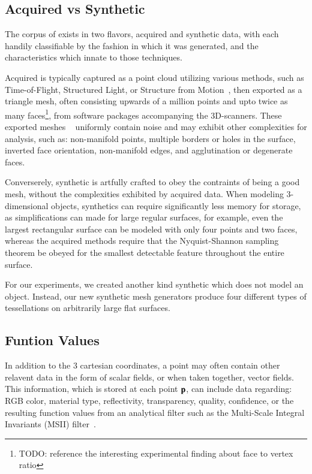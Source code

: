 \subsection{Acquired vs Synthetic \tdd{}}
\label{chBsSvA}
The corpus of \tdd{} exists in two flavors, acquired and synthetic data, with each handily classifiable by the fashion in which it was generated, and the characteristics which innate to those techniques.

Acquired \tdd{} is typically captured as a point cloud utilizing various methods, such as Time-of-Flight, Structured Light, or Structure from Motion~\cite[p.~19]{Mara12}, then exported as a triangle mesh, often consisting upwards of a million points and upto twice as many faces\footnote{TODO: reference the interesting experimental finding about face to vertex ratio}, from software packages accompanying the 3D-scanners. These exported meshes ~\cite[p.~25]{Mara12} uniformly contain noise and may exhibit other complexities for analysis, such as: non-manifold points, multiple borders or holes in the surface, inverted face orientation, non-manifold edges, and agglutination or degenerate faces. ~\cite[p.~28-32]{Mara12}

Converserely, synthetic \tdd{} is artfully crafted to obey the contraints of being a good mesh, without the complexities exhibited by acquired data. When modeling 3-dimensional objects, synthetics can require significantly less memory for storage, as simplifications can made for large regular surfaces, for example, even the largest rectangular surface can be modeled with only four points and two faces, whereas the acquired methods require that the Nyquist-Shannon sampling theorem be obeyed for the smallest detectable feature throughout the entire surface.

For our experiments, we created another kind synthetic \tdd{} which does not model an object. Instead, our new synthetic mesh generators produce four different types of tessellations on arbitrarily large flat surfaces.

%
\subsection{Funtion Values}
\label{chBsFV}
In addition to the 3 cartesian coordinates, a point may often contain other relavent data in the form of scalar fields, or when taken together, vector fields. This information, which is stored at each point $\mathbf{p}$, can include data regarding: RGB color, material type, reflectivity, transparency, quality, confidence, or the resulting function values from an analytical filter such as the Multi-Scale Integral Invariants (MSII) filter~\cite[p.~21]{Mara12}.

